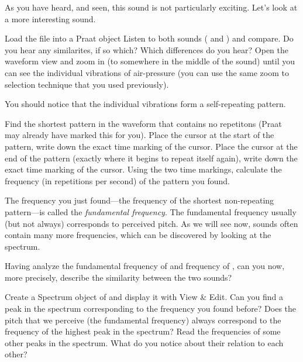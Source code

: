\documentclass[a4paper, 9pt]{article}
\begin{document}
As you have heard, and seen, this sound is not particularly exciting.
Let's look at a more interesting sound.

\begin{exercise}
\action Load the file  into a Praat object 
\action Listen to both sounds ( and ) and compare. Do you hear any similarites, if so which? Which differences do you hear?
\action Open the waveform view and zoom in (to somewhere in the middle of the sound) until you can see the individual vibrations of air-pressure (you can use the same zoom to selection technique that you used previously).
\end{exercise}

You should notice that the individual vibrations form a self-repeating
pattern.

\begin{exercise}
\action Find the shortest pattern in the waveform that contains no repetitons (Praat may already have marked this for you).
\action Place the cursor at the start of the pattern, write down the exact time marking of the cursor. 
\action Place the cursor at the end of the pattern (exactly where it begins to repeat itself again), write down the exact time marking of the cursor. 
\ask Using the two time markings, calculate the frequency (in repetitions per second) of the pattern you found. 
\end{exercise}

The frequency you just found---the frequency of the shortest
non-repeating pattern---is called the \emph{fundamental frequency}. The
fundamental frequency usually (but not always) corresponds to perceived
pitch. As we will see now, sounds often contain many more frequencies,
which can be discovered by looking at the spectrum.

\begin{exercise}
\ask Having analyze the fundamental frequency of  and frequency of , can you now, more precisely, describe the similarity between the two sounds?
\end{exercise}

\begin{exercise}
\action Create a Spectrum object of  and display it with View \& Edit. 
\action Can you find a peak in the spectrum corresponding to the frequency you found before?  
\askstar Does the pitch that we perceive (the fundamental frequency) always correspond to the frequency of the highest peak in the spectrum? 
\action Read the frequencies of some other peaks in the spectrum. What do you notice about their relation to each other?
\end{exercise}
\end{document}

